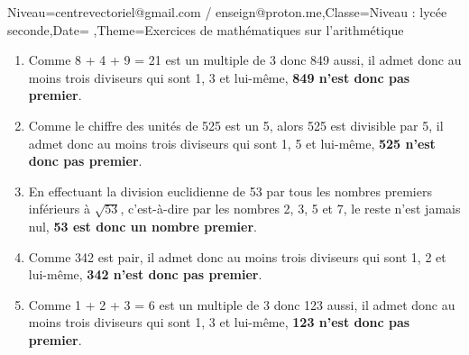 \documentclass[a4paper,11pt,fleqn]{article}
\begin{document}
\begin{Maquette}[Fiche]{Niveau=centrevectoriel@gmail.com / enseign@proton.me,Classe=Niveau :  lycée seconde,Date=   ,Theme=Exercices de mathématiques  sur l'arithmétique }
\begin{Solution}
\begin{enumerate}[itemsep=1em]
	\item \begin{minipage}[t]{\linewidth} Comme 8 + 4 + 9 = 21 est un multiple de 3 donc 849 aussi, il admet donc au moins trois diviseurs qui sont 1, 3 et lui-même, {\bfseries \color[HTML]{f15929}849 n'est donc pas premier}. \end{minipage}
	\item \begin{minipage}[t]{\linewidth} Comme le chiffre des unités de 525 est un 5, alors 525 est divisible par 5, il admet donc au moins trois diviseurs qui sont 1, 5 et lui-même, {\bfseries \color[HTML]{f15929}525 n'est donc pas premier}. \end{minipage}
	\item \begin{minipage}[t]{\linewidth} En effectuant la division euclidienne de 53 par tous les nombres premiers inférieurs à $\sqrt{53}$, c'est-à-dire par les nombres 2, 3, 5 et 7, le reste n'est jamais nul, {\bfseries \color[HTML]{f15929}53 est donc un nombre premier}. \end{minipage}
	\item \begin{minipage}[t]{\linewidth} Comme 342 est pair, il admet donc au moins trois diviseurs qui sont 1, 2 et lui-même, {\bfseries \color[HTML]{f15929}342 n'est donc pas premier}. \end{minipage}
	\item \begin{minipage}[t]{\linewidth} Comme 1 + 2 + 3 = 6 est un multiple de 3 donc 123 aussi, il admet donc au moins trois diviseurs qui sont 1, 3 et lui-même, {\bfseries \color[HTML]{f15929}123 n'est donc pas premier}. \end{minipage}
\end{enumerate}
\end{Solution}

\end{Maquette}
\clearpage
\end{document}
